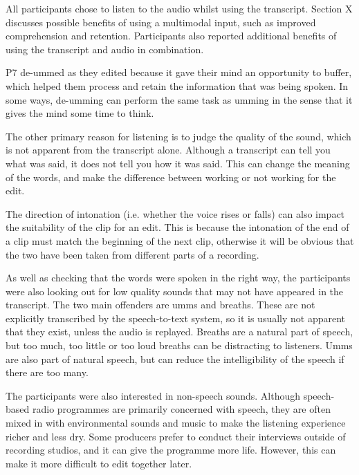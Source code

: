 All participants chose to listen to the audio whilst using the transcript. Section X discusses possible benefits of
using a multimodal input, such as improved comprehension and retention. Participants also reported additional benefits
of using the transcript and audio in combination.


P7 de-ummed as they edited because it gave their mind an opportunity to buffer, which helped them process and retain
the information that was being spoken. In some ways, de-umming can perform the same task as umming in the sense that it
gives the mind some time to think.


The other primary reason for listening is to judge the quality of the sound, which is not apparent from the transcript
alone. Although a transcript can tell you what was said, it does not tell you how it was said. This can change the
meaning of the words, and make the difference between working or not working for the edit.


The direction of intonation (i.e. whether the voice rises or falls) can also impact the suitability of the clip for an
edit. This is because the intonation of the end of a clip must match the beginning of the next clip, otherwise it will
be obvious that the two have been taken from different parts of a recording.


As well as checking that the words were spoken in the right way, the participants were also looking out for low quality
sounds that may not have appeared in the transcript. The two main offenders are umms and breaths. These are not
explicitly transcribed by the speech-to-text system, so it is usually not apparent that they exist, unless the audio is
replayed. Breaths are a natural part of speech, but too much, too little or too loud breaths can be distracting to
listeners. Umms are also part of natural speech, but can reduce the intelligibility of the speech if there are too
many.


The participants were also interested in non-speech sounds. Although speech-based radio programmes are primarily
concerned with speech, they are often mixed in with environmental sounds and music to make the listening experience
richer and less dry. Some producers prefer to conduct their interviews outside of recording studios, and it can give
the programme more life. However, this can make it more difficult to edit together later.

